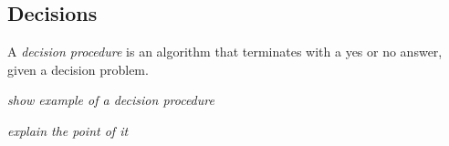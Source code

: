 










\subsection{Decisions}


A \textit{decision procedure} is an algorithm that terminates with a yes or no answer, given a decision problem.\cite{decisionproceduresbook} 

\textit{show example of a decision procedure}

\textit{explain the point of it}







